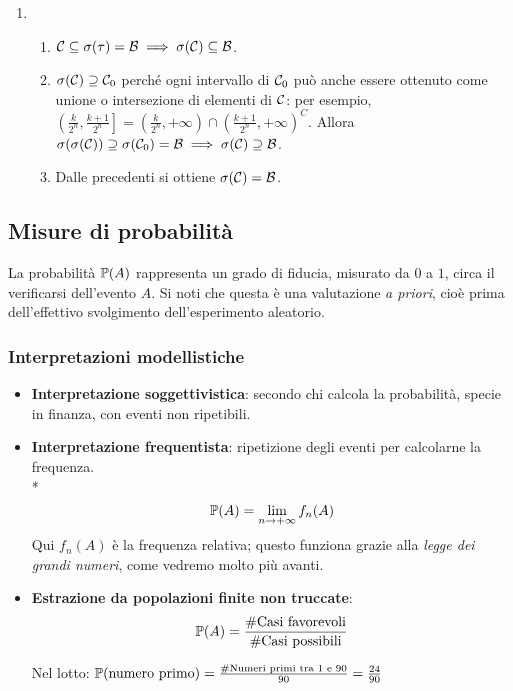 \begin{dimo}
\begin{enumerate}
    \item \begin{enumerate}
      \item $\mathcal C \subseteq \sigma(\tau) = \mathcal B \implies \sigma(\mathcal C) \subseteq \mathcal B$.
      \item $\sigma(\mathcal C) \supseteq \mathcal C_0$ perché ogni intervallo di $\mathcal C_0$ può anche essere ottenuto come unione o intersezione di elementi di $\mathcal C$: per esempio,
      $\left(\frac{k}{2^n}, \frac{k+1}{2^n} \right] = \left( \frac k {2^n}, +\infty \right) \cap \left( \frac {k+1} {2^n},+\infty \right)^C$. Allora $\sigma(\sigma(\mathcal C)) \supseteq \sigma(\mathcal C_0)=\mathcal B \implies \sigma(\mathcal C) \supseteq \mathcal B$.
      \item Dalle precedenti si ottiene $\sigma(\mathcal C) = \mathcal B$. \qedhere
    \end{enumerate}
  \end{enumerate}
\end{dimo}
\subsection{Misure di probabilità}\label{come-assegnare-prob}
La probabilità $\mathbb P(A)$ rappresenta un grado di fiducia, misurato da $0$ a $1$, circa il verificarsi dell'evento $A$. Si noti che questa è una valutazione \emph{a priori}, cioè prima dell'effettivo svolgimento dell'esperimento aleatorio.
\subsubsection{Interpretazioni modellistiche}
\begin{itemize}
  \item \textbf{Interpretazione soggettivistica}: secondo chi calcola la probabilità, specie in finanza, con eventi non ripetibili.
  \item \textbf{Interpretazione frequentista}: ripetizione degli eventi per calcolarne la frequenza.\\*
    $$\mathbb P(A) = \lim_{n \to +\infty} f_n(A)$$
    Qui $f_n(A)$ è la frequenza relativa; questo funziona grazie alla \textit{legge dei grandi numeri}, come vedremo molto più avanti.
  \item \textbf{Estrazione da popolazioni finite non truccate}:
    $$\mathbb P(A) = \frac{\#\text{Casi favorevoli}}{\#\text{Casi possibili}}$$
    \begin{ese}
      Nel lotto: $\mathbb P(\text{numero primo}) = \frac{\#\text{Numeri primi tra } 1 \text{ e } 90}{90} = \frac{24}{90}$
    \end{ese}
\end{itemize}

